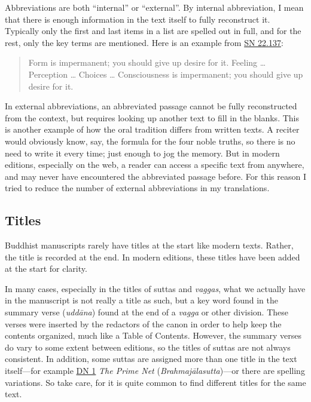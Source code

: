 \documentclass[12pt,openany]{book}%
\begin{document}
Abbreviations are both “internal” or “external”. By internal abbreviation, I mean that there is enough information in the text itself to fully reconstruct it. Typically only the first and last items in a list are spelled out in full, and for the rest, only the key terms are mentioned. Here is an example from \href{https://suttacentral.net/sn22.137}{SN 22.137}:

\begin{quotation}%
Form is impermanent; you should give up desire for it. Feeling … Perception … Choices … Consciousness is impermanent; you should give up desire for it.

%
\end{quotation}

In external abbreviations, an abbreviated passage cannot be fully reconstructed from the context, but requires looking up another text to fill in the blanks. This is another example of how the oral tradition differs from written texts. A reciter would obviously know, say, the formula for the four noble truths, so there is no need to write it every time; just enough to jog the memory. But in modern editions, especially on the web, a reader can access a specific text from anywhere, and may never have encountered the abbreviated passage before. For this reason I tried to reduce the number of external abbreviations in my translations.

\subsection*{Titles}

Buddhist manuscripts rarely have titles at the start like modern texts. Rather, the title is recorded at the end. In modern editions, these titles have been added at the start for clarity.

In many cases, especially in the titles of suttas and \textit{vaggas}, what we actually have in the manuscript is not really a title as such, but a key word found in the summary verse (\textit{\textsanskrit{uddāna}}) found at the end of a \textit{vagga} or other division. These verses were inserted by the redactors of the canon in order to help keep the contents organized, much like a Table of Contents. However, the summary verses do vary to some extent between editions, so the titles of suttas are not always consistent. In addition, some suttas are assigned more than one title in the text itself—for example \href{https://suttacentral.net/dn1}{DN 1} \textit{The Prime Net} (\textit{\textsanskrit{Brahmajālasutta}})—or there are spelling variations. So take care, for it is quite common to find different titles for the same text.
\end{document}

